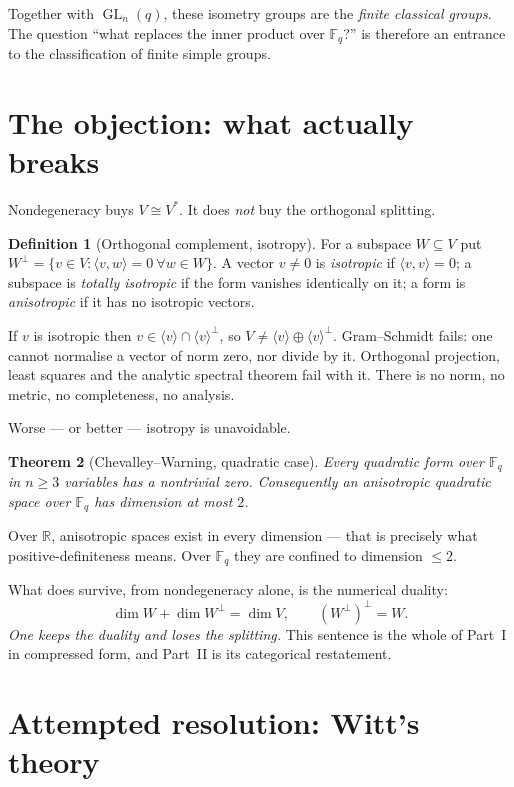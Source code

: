\documentclass[11pt,a4paper]{article}
\newtheorem{theorem}{Theorem}[section]
\theoremstyle{definition}
\newtheorem{definition}[theorem]{Definition}
\theoremstyle{remark}
\newcommand{\FF}{\mathbb{F}}
\newcommand{\RR}{\mathbb{R}}
\newcommand{\ip}[2]{\langle #1, #2 \rangle}
\newcommand{\dual}[1]{#1^{*}}
\newcommand{\perpp}{^{\perp}}
\DeclareMathOperator{\GL}{GL}
\begin{document}
Together with $\GL_n(q)$, these isometry groups are the \emph{finite classical groups}. The
question ``what replaces the inner product over $\FF_q$?'' is therefore an entrance to the
classification of finite simple groups.

\section{The objection: what actually breaks}\label{sec:breaks}

Nondegeneracy buys $V \cong \dual{V}$. It does \emph{not} buy the orthogonal splitting.

\begin{definition}[Orthogonal complement, isotropy]
For a subspace $W \subseteq V$ put $W\perpp = \{v \in V : \ip{v}{w} = 0 \ \forall w \in W\}$.
A vector $v \neq 0$ is \emph{isotropic} if $\ip{v}{v} = 0$; a subspace is \emph{totally
isotropic} if the form vanishes identically on it; a form is \emph{anisotropic} if it has no
isotropic vectors.
\end{definition}

If $v$ is isotropic then $v \in \langle v\rangle \cap \langle v\rangle\perpp$, so $V \neq
\langle v\rangle \oplus \langle v\rangle\perpp$. Gram--Schmidt fails: one cannot normalise a
vector of norm zero, nor divide by it. Orthogonal projection, least squares and the analytic
spectral theorem fail with it. There is no norm, no metric, no completeness, no analysis.

Worse --- or better --- isotropy is unavoidable.

\begin{theorem}[Chevalley--Warning, quadratic case]
Every quadratic form over $\FF_q$ in $n \geq 3$ variables has a nontrivial zero. Consequently
an anisotropic quadratic space over $\FF_q$ has dimension at most $2$.
\end{theorem}

Over $\RR$, anisotropic spaces exist in every dimension --- that is precisely what
positive-definiteness means. Over $\FF_q$ they are confined to dimension $\leq 2$.

What does survive, from nondegeneracy alone, is the numerical duality:
\[
  \dim W + \dim W\perpp = \dim V, \qquad (W\perpp)\perpp = W .
\]
\emph{One keeps the duality and loses the splitting.} This sentence is the whole of Part~I in
compressed form, and Part~II is its categorical restatement.

\section{Attempted resolution: Witt's theory}
\end{document}
